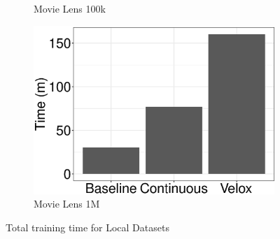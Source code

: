 \documentclass{vldb}
\begin{document}
\begin{figure}[h]
\begin{subfigure}[b]{0.2\textwidth}
	\caption{Movie Lens 100k}
	\label{fig:movie-lens-100k-times}
\end{subfigure}%
\begin{subfigure}[b]{0.2\textwidth}
  	\includegraphics[width=\linewidth, height=\linewidth,keepaspectratio]{../images/experiment-results/movie-lens-1M-times.eps}
	\caption{Movie Lens 1M}
	\label{fig:movie-lens-1M-times}
\end{subfigure}%
\vspace{2mm}
\caption{Total training time for Local Datasets}
 \label{fig:local-training-time}
\end{figure}
\end{document}
